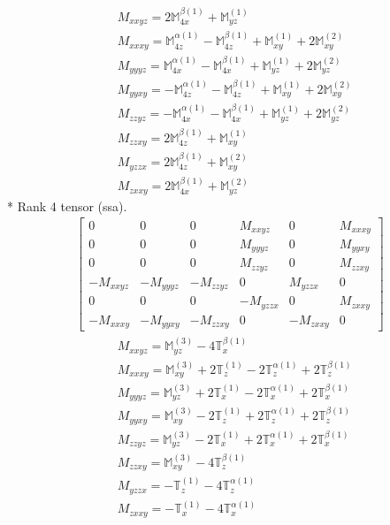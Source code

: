 \documentclass[fleqn,8pt,landscape]{jsarticle}
\begin{document}
\begin{align*}
& M_{xxyz} = 2 \mathbb{M}_{4x}^{\beta(1)} + \mathbb{M}_{yz}^{(1)} \\
& M_{xxxy} = \mathbb{M}_{4z}^{\alpha(1)} - \mathbb{M}_{4z}^{\beta(1)} + \mathbb{M}_{xy}^{(1)} + 2 \mathbb{M}_{xy}^{(2)} \\
& M_{yyyz} = \mathbb{M}_{4x}^{\alpha(1)} - \mathbb{M}_{4x}^{\beta(1)} + \mathbb{M}_{yz}^{(1)} + 2 \mathbb{M}_{yz}^{(2)} \\
& M_{yyxy} = - \mathbb{M}_{4z}^{\alpha(1)} - \mathbb{M}_{4z}^{\beta(1)} + \mathbb{M}_{xy}^{(1)} + 2 \mathbb{M}_{xy}^{(2)} \\
& M_{zzyz} = - \mathbb{M}_{4x}^{\alpha(1)} - \mathbb{M}_{4x}^{\beta(1)} + \mathbb{M}_{yz}^{(1)} + 2 \mathbb{M}_{yz}^{(2)} \\
& M_{zzxy} = 2 \mathbb{M}_{4z}^{\beta(1)} + \mathbb{M}_{xy}^{(1)} \\
& M_{yzzx} = 2 \mathbb{M}_{4z}^{\beta(1)} + \mathbb{M}_{xy}^{(2)} \\
& M_{zxxy} = 2 \mathbb{M}_{4x}^{\beta(1)} + \mathbb{M}_{yz}^{(2)}
\end{align*}
* Rank 4 tensor (ssa).
\begin{align*}
\begin{bmatrix} 0 & 0 & 0 & M_{xxyz} & 0 & M_{xxxy} \\ 0 & 0 & 0 & M_{yyyz} & 0 & M_{yyxy} \\ 0 & 0 & 0 & M_{zzyz} & 0 & M_{zzxy} \\ - M_{xxyz} & - M_{yyyz} & - M_{zzyz} & 0 & M_{yzzx} & 0 \\ 0 & 0 & 0 & - M_{yzzx} & 0 & M_{zxxy} \\ - M_{xxxy} & - M_{yyxy} & - M_{zzxy} & 0 & - M_{zxxy} & 0 \end{bmatrix}
\end{align*}
\begin{align*}
& M_{xxyz} = \mathbb{M}_{yz}^{(3)} - 4 \mathbb{T}_{x}^{\beta(1)} \\
& M_{xxxy} = \mathbb{M}_{xy}^{(3)} + 2 \mathbb{T}_{z}^{(1)} - 2 \mathbb{T}_{z}^{\alpha(1)} + 2 \mathbb{T}_{z}^{\beta(1)} \\
& M_{yyyz} = \mathbb{M}_{yz}^{(3)} + 2 \mathbb{T}_{x}^{(1)} - 2 \mathbb{T}_{x}^{\alpha(1)} + 2 \mathbb{T}_{x}^{\beta(1)} \\
& M_{yyxy} = \mathbb{M}_{xy}^{(3)} - 2 \mathbb{T}_{z}^{(1)} + 2 \mathbb{T}_{z}^{\alpha(1)} + 2 \mathbb{T}_{z}^{\beta(1)} \\
& M_{zzyz} = \mathbb{M}_{yz}^{(3)} - 2 \mathbb{T}_{x}^{(1)} + 2 \mathbb{T}_{x}^{\alpha(1)} + 2 \mathbb{T}_{x}^{\beta(1)} \\
& M_{zzxy} = \mathbb{M}_{xy}^{(3)} - 4 \mathbb{T}_{z}^{\beta(1)} \\
& M_{yzzx} = - \mathbb{T}_{z}^{(1)} - 4 \mathbb{T}_{z}^{\alpha(1)} \\
& M_{zxxy} = - \mathbb{T}_{x}^{(1)} - 4 \mathbb{T}_{x}^{\alpha(1)}
\end{align*}
\end{document}
